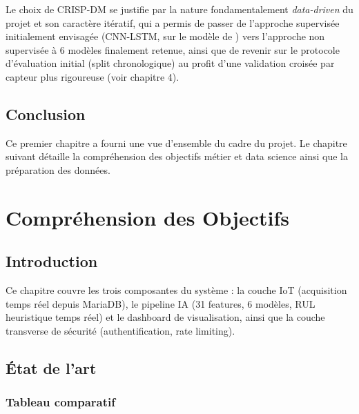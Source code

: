 \documentclass[12pt,a4paper]{report}
\begin{document}
Le choix de CRISP-DM se justifie par la nature fondamentalement \textit{data-driven}
du projet et son caractère itératif, qui a permis de passer de l'approche supervisée
initialement envisagée (CNN-LSTM, sur le modèle de \cite{zhao2017}) vers l'approche non
supervisée à 6 modèles finalement retenue, ainsi que de revenir sur le protocole d'évaluation initial (split chronologique)
au profit d'une validation croisée par capteur plus rigoureuse (voir chapitre 4).

\section{Conclusion}

Ce premier chapitre a fourni une vue d'ensemble du cadre du projet. Le chapitre suivant
détaille la compréhension des objectifs métier et data science ainsi que la préparation des données.

\chapter{Compréhension des Objectifs}

\section{Introduction}

Ce chapitre couvre les trois composantes du système : la couche IoT (acquisition temps réel depuis MariaDB), le pipeline IA (31 features, 6 modèles, RUL heuristique temps réel) et le dashboard de visualisation, ainsi que la couche transverse de sécurité (authentification, rate limiting).

\section{État de l'art}

\subsection{Tableau comparatif}
\end{document}
